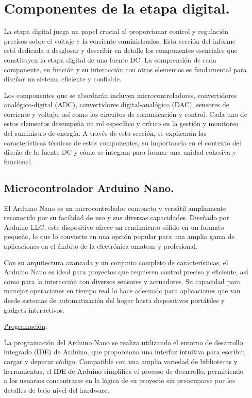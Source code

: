 \section{Componentes de la etapa digital.}
La etapa digital juega un papel crucial al proporcionar control y regulación precisos sobre el voltaje y la corriente suministrados. Esta sección del informe está dedicada a desglosar y describir en detalle los componentes esenciales que constituyen la etapa digital de una fuente DC. La comprensión de cada componente, su función y su interacción con otros elementos es fundamental para diseñar un sistema eficiente y confiable.\par 
Los componentes que se abordarán incluyen microcontroladores, convertidores analógico-digital (ADC), convertidores digital-analógico (DAC), sensores de corriente y voltaje, así como los circuitos de comunicación y control. Cada uno de estos elementos desempeña un rol específico y crítico en la gestión y monitoreo del suministro de energía. A través de esta sección, se explicarán las características técnicas de estos componentes, su importancia en el contexto del diseño de la fuente DC y cómo se integran para formar una unidad cohesiva y funcional.

\subsection{Microcontrolador Arduino Nano.}
El Arduino Nano es un microcontrolador compacto y versátil ampliamente reconocido por su facilidad de uso y sus diversas capacidades. Diseñado por Arduino LLC, este dispositivo ofrece un rendimiento sólido en un formato pequeño, lo que lo convierte en una opción popular para una amplia gama de aplicaciones en el ámbito de la electrónica amateur y profesional.\par 
Con su arquitectura avanzada y un conjunto completo de características, el Arduino Nano es ideal para proyectos que requieren control preciso y eficiente, así como para la interacción con diversos sensores y actuadores. Su capacidad para manejar operaciones en tiempo real lo hace adecuado para aplicaciones que van desde sistemas de automatización del hogar hasta dispositivos portátiles y gadgets interactivos.

\underline{Programación}: \par 
La programación del Arduino Nano se realiza utilizando el entorno de desarrollo integrado (IDE) de Arduino, que proporciona una interfaz intuitiva para escribir, cargar y depurar código. Compatible con una amplia variedad de bibliotecas y herramientas, el IDE de Arduino simplifica el proceso de desarrollo, permitiendo a los usuarios concentrarse en la lógica de su proyecto sin preocuparse por los detalles de bajo nivel del hardware.

